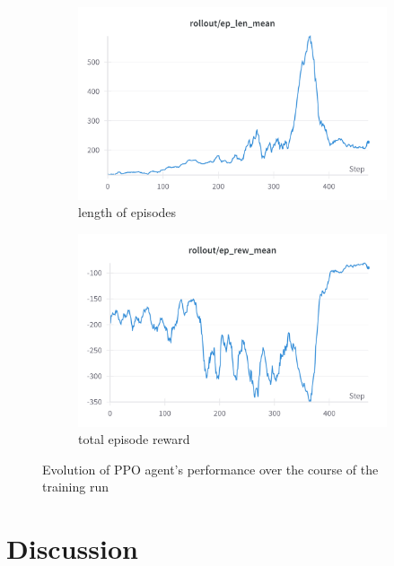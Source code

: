 \begin{figure}
    \begin{subfigure}{0.48\linewidth}
      \includegraphics[width=\linewidth]{images/auto-als-ppo-len.png}
      \caption{length of episodes}
    \end{subfigure}
    \begin{subfigure}{0.48\linewidth}
      \includegraphics[width=\linewidth]{images/auto-als-ppo-rew.png}
      \caption{total episode reward}
    \end{subfigure}
    \caption{Evolution of PPO agent's performance over the course of the training run}
\end{figure}

\newpage
\section{Discussion}